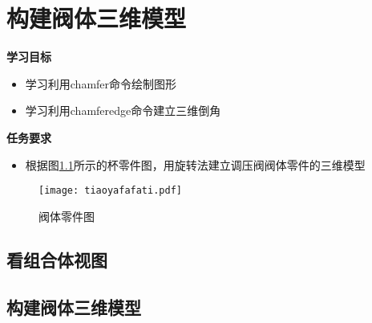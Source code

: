 \chapter{构建阀体三维模型}

{\bfseries 学习目标}
\begin{itemize}
\item 学习利用chamfer命令绘制图形
\item 学习利用chamferedge命令建立三维倒角
\end{itemize}

{\bfseries 任务要求}
\begin{itemize}
\item 根据图\ref{fig:tiaoyafafati}所示的杯零件图，用旋转法建立调压阀阀体零件的三维模型
\end{itemize}

\noindent
\begin{figure}[htbp]
\centering
\texttt{[image: tiaoyafafati.pdf]}
\caption{阀体零件图}\label{fig:tiaoyafafati}
\end{figure}
\clearpage
\section{看组合体视图}



\section{构建阀体三维模型}


\endinput
